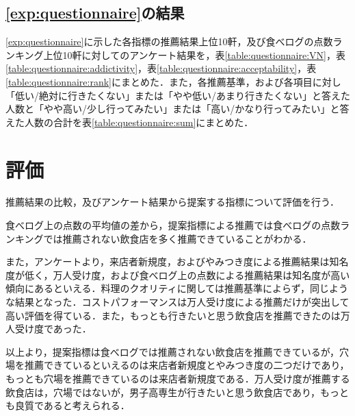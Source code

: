 	\subsection{\ref{exp:questionnaire}の結果}
	\ref{exp:questionnaire}に示した各指標の推薦結果上位10軒，及び食べログの点数ランキング上位10軒に対してのアンケート結果を，表\ref{table:questionnaire:VN}，表\ref{table:questionnaire:addictivity}，表\ref{table:questionnaire:acceptability}，表\ref{table:questionnaire:rank}にまとめた．また，各推薦基準，および各項目に対し「低い/絶対に行きたくない」または「やや低い/あまり行きたくない」と答えた人数と「やや高い/少し行ってみたい」または「高い/かなり行ってみたい」と答えた人数の合計を表\ref{table:questionnaire:sum}にまとめた．
	
	
	
	
	
	
	\newpage

\section{評価}
推薦結果の比較，及びアンケート結果から提案する指標について評価を行う．\par
食べログ上の点数の平均値の差から，提案指標による推薦では食べログの点数ランキングでは推薦されない飲食店を多く推薦できていることがわかる．\par
また，アンケートより，来店者新規度，およびやみつき度による推薦結果は知名度が低く，万人受け度，および食べログ上の点数による推薦結果は知名度が高い傾向にあるといえる．料理のクオリティに関しては推薦基準によらず，同じような結果となった．コストパフォーマンスは万人受け度による推薦だけが突出して高い評価を得ている．また，もっとも行きたいと思う飲食店を推薦できたのは万人受け度であった．\par
以上より，提案指標は食べログでは推薦されない飲食店を推薦できているが，穴場を推薦できているといえるのは来店者新規度とやみつき度の二つだけであり，もっとも穴場を推薦できているのは来店者新規度である．万人受け度が推薦する飲食店は，穴場ではないが，男子高専生が行きたいと思う飲食店であり，もっとも良質であると考えられる．

